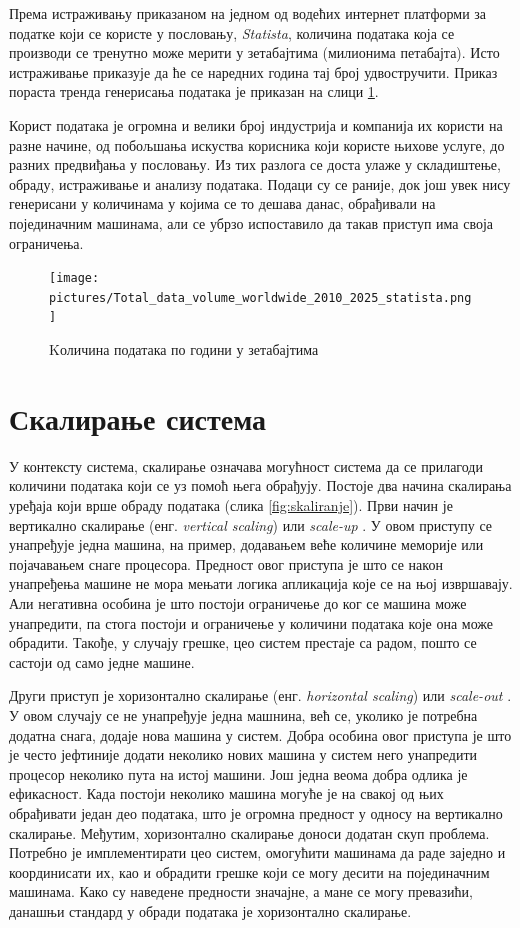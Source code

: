 \documentclass[12pt,oneside]{memoir}
\begin{document}
Према истраживању \cite{volume_data} приказаном на једном од водећих интернет платформи за податке који се користе у пословању, \textit{Statista}, количина података која се производи се тренутно може мерити у зетабајтима (милионима петабајта). Исто истраживање приказује да ће се наредних година тај број удвостручити. Приказ пораста тренда генерисања података је приказан на слици \ref{fig:kolicina_podataka}.

Корист података је огромна и велики број индустрија и компанија их користи на разне начине, од побољшања искуства корисника који користе њихове услуге, до разних предвиђања у пословању. Из тих разлога се доста улаже у складиштење, обраду, истраживање и анализу података. Подаци су се раније, док још увек нису генерисани у количинама у којима се то дешава данас, обрађивали на појединачним машинама, али се убрзо испоставило да такав приступ има своја ограничења.

\begin{figure}[!ht]
  \centering
  \texttt{[image: pictures/Total\_data\_volume\_worldwide\_2010\_2025\_statista.png]}
  \caption{Kоличина података по години у зетабајтима \cite{volume_data}}
  \label{fig:kolicina_podataka}
\end{figure}

\section{Скалирање система}
\label{sec:skaliranje}

У контексту система, скалирање означава могућност система да се прилагоди количини података који се уз помоћ њега обрађују. Постоје два начина скалирања уређаја који врше обраду података (слика \ref{fig:skaliranje}). Први начин је вертикално скалирање (енг. \textit{vertical scaling}) или \textit{scale-up} \cite{hadoop_beginner}. У овом приступу се унапређује једна машина, на пример, додавањем веће количине меморије или појачавањем снаге процесора. Предност овог приступа је што се након унапређења машине не мора мењати логика апликација које се на њој извршавају. Али негативна особина је што постоји ограничење до ког се машина може унапредити, па стога постоји и ограничење у количини података које она може обрадити. Такође, у случају грешке, цео систем престаје са радом, пошто се састоји од само једне машине.

Други приступ је хоризонтално скалирање (енг. \textit{horizontal scaling}) или \textit{scale-out} \cite{hadoop_beginner}. У овом случају се не унапређује једна машнина, већ се, уколико је потребна додатна снага, додаје нова машина у систем. Добра особина овог приступа је што је често јефтиније додати неколико нових машина у систем него унапредити процесор неколико пута на истој машини. Још једна веома добра одлика је ефикасност. Када постоји неколико машина могуће је на свакој од њих обрађивати један део података, што је огромна предност у односу на вертикално скалирање. Међутим, хоризонтално скалирање доноси додатан скуп проблема. Потребно је имплементирати цео систем, омогућити машинама да раде заједно и координисати их, као и обрадити грешке који се могу десити на појединачним машинама. Како су наведене предности значајне, а мане се могу превазићи, данашњи стандард у обради података је хоризонтално скалирање.
\end{document}
